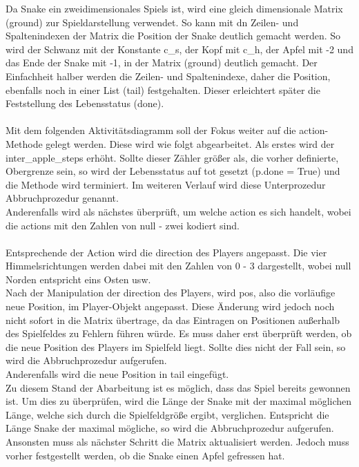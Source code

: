 Da Snake ein zweidimensionales Spiels ist, wird eine gleich dimensionale Matrix (ground) zur Spieldarstellung verwendet.
So kann mit dn Zeilen- und Spaltenindexen der Matrix die Position der Snake deutlich gemacht werden. So wird der Schwanz mit der Konstante c\_s, der Kopf mit c\_h, der Apfel mit -2 und das Ende der Snake mit -1, in der Matrix (ground) deutlich gemacht.
Der Einfachheit halber werden die Zeilen- und Spaltenindexe, daher die Position, ebenfalls noch in einer List (tail) festgehalten. Dieser erleichtert später die Feststellung des Lebensstatus (done).\\
\\Mit dem folgenden Aktivitätsdiagramm soll der Fokus weiter auf die action-Methode gelegt werden. Diese wird wie folgt abgearbeitet.
Als erstes wird der inter\_apple\_steps erhöht. Sollte dieser Zähler größer als, die vorher definierte, Obergrenze sein, so wird der Lebensstatus auf tot gesetzt (p.done = True) und die Methode wird terminiert. Im weiteren Verlauf wird diese Unterprozedur Abbruchprozedur genannt.\\
Anderenfalls wird als nächstes überprüft, um welche action es sich handelt, wobei die actions mit den Zahlen von null - zwei kodiert sind.\\
\\Entsprechende der Action wird die direction des Players angepasst. Die vier Himmelsrichtungen werden dabei mit den Zahlen von 0 - 3 dargestellt, wobei null Norden entspricht eins Osten usw.\\
Nach der Manipulation der direction des Players, wird pos, also die vorläufige neue Position, im Player-Objekt angepasst. 
Diese Änderung wird jedoch noch nicht sofort in die Matrix übertrage, da das Eintragen on Positionen außerhalb des Spielfeldes zu Fehlern führen würde. Es muss daher erst überprüft werden, ob die neue Position des Players im Spielfeld liegt. Sollte dies nicht der Fall sein, so wird die Abbruchprozedur aufgerufen.\\
Anderenfalls wird die neue Position in tail eingefügt.\\
Zu diesem Stand der Abarbeitung ist es möglich, dass das Spiel bereits gewonnen ist. Um dies zu überprüfen, wird die Länge der Snake mit der maximal möglichen Länge, welche sich durch die Spielfeldgröße ergibt, verglichen. Entspricht die Länge Snake der maximal mögliche, so wird die Abbruchprozedur aufgerufen.
Ansonsten muss als nächster Schritt die Matrix aktualisiert werden. Jedoch muss vorher festgestellt werden, ob die Snake einen Apfel gefressen hat.\\
